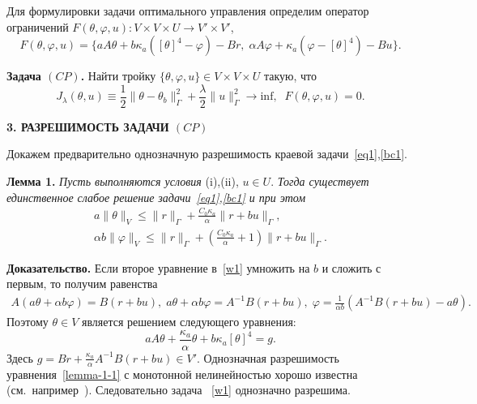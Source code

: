 \documentclass[12pt]{article}
\begin{document}
    Для формулировки задачи оптимального управления определим оператор
    ограничений $F(\theta, \varphi, u) : V \times V \times U \rightarrow V' \times V'$,
    \[
        F(\theta, \varphi, u) = \{ aA\theta + b \kappa_a ( [\theta]^4- \varphi) - Br,\;
        \alpha A \varphi + \kappa_a (\varphi -[\theta]^4) - Bu\}.
    \]


    \textbf{Задача $(CP)$.} Найти тройку $\{\theta, \varphi, u \} \in V \times V \times U$
    такую, что
    \begin{equation}
        \label{CP}
        J_\lambda(\theta, u) \equiv \frac{1}{2}\|\theta -\theta_b\|^2_\Gamma
        + \frac{\lambda}{2}\|u\|^2_\Gamma \rightarrow \text{inf},\;\; F(\theta, \varphi, u)=0.
    \end{equation}





    \begin{center}
        \textbf{3. РАЗРЕШИМОСТЬ ЗАДАЧИ $(CP)$}
    \end{center}

    Докажем предварительно однозначную разрешимость краевой задачи~\eqref{eq1},\eqref{bc1}.

    \textbf{Лемма 1.}
    \textit{Пусть выполняются условия} (i),(ii), $u\in U$.
    \textit{Тогда существует единственное слабое решение задачи~\eqref{eq1},\eqref{bc1} и при этом}
    \begin{equation}
        \label{E1}
        \begin{aligned}
            a\|\theta\|_V \leq \|r\|_\Gamma + \frac{C_0\kappa_a}{\alpha}\|r+bu\|_\Gamma, \\
            \alpha b \|\varphi\|_V \leq \|r\|_\Gamma +
            \left(\frac{C_0\kappa_a}{\alpha} + 1\right)\|r+bu\|_\Gamma.
        \end{aligned}
    \end{equation}

    \textbf{Доказательство.}
    Если второе уравнение в~\eqref{w1} умножить на $b$ и сложить с первым, то получим равенства
    \begin{gather*}
        A \left( a \theta + \alpha b \varphi \right) = B(r + bu),\;
        a\theta + \alpha b \varphi = A^{-1}B(r + bu),\;
        \varphi = \frac{1}{\alpha b}(A^{-1}B(r +bu) - a\theta).
    \end{gather*}
    Поэтому $\theta \in V$ является решением следующего уравнения:
    \begin{equation}
        \label{lemma-1-1}
        a A \theta + \frac{\kappa_a}{\alpha} \theta + b\kappa_a [\theta]^4 = g.
    \end{equation}
    Здесь $g = Br + \frac{\kappa_a}{\alpha}A^{-1}B(r+bu) \in V'.$
    Однозначная разрешимость уравнения~\eqref{lemma-1-1} с монотонной нелинейностью
    хорошо известна (см.\ например~\cite{Kufner}).
    Следовательно задача ~\eqref{w1} однозначно разрешима.
\end{document}
